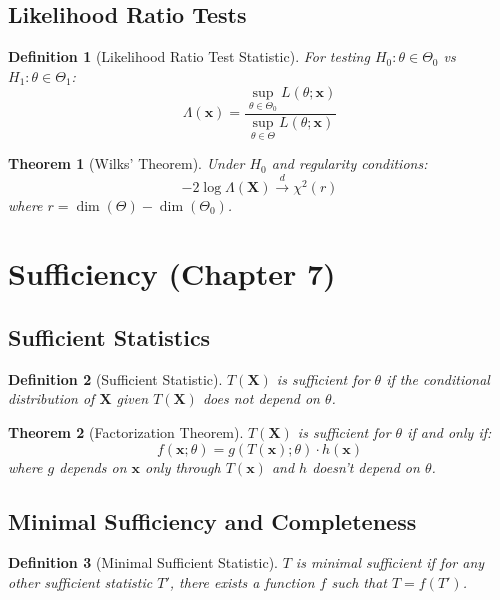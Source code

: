 \documentclass[12pt,a4paper]{amsart}
\newtheorem{theorem}{Theorem}[section]
\newtheorem{definition}{Definition}[section]
\theoremstyle{remark}
\begin{document}
\subsection{Likelihood Ratio Tests}

\begin{definition}[Likelihood Ratio Test Statistic]
For testing $H_0: \theta \in \Theta_0$ vs $H_1: \theta \in \Theta_1$:
$$\Lambda(\mathbf{x}) = \frac{\sup_{\theta \in \Theta_0} L(\theta; \mathbf{x})}{\sup_{\theta \in \Theta} L(\theta; \mathbf{x})}$$
\end{definition}

\begin{theorem}[Wilks' Theorem]
Under $H_0$ and regularity conditions:
$$-2\log\Lambda(\mathbf{X}) \stackrel{d}{\to} \chi^2(r)$$
where $r = \dim(\Theta) - \dim(\Theta_0)$.
\end{theorem}

\section{Sufficiency (Chapter 7)}

\subsection{Sufficient Statistics}

\begin{definition}[Sufficient Statistic]
$T(\mathbf{X})$ is sufficient for $\theta$ if the conditional distribution of $\mathbf{X}$ given $T(\mathbf{X})$ does not depend on $\theta$.
\end{definition}

\begin{theorem}[Factorization Theorem]
$T(\mathbf{X})$ is sufficient for $\theta$ if and only if:
$$f(\mathbf{x}; \theta) = g(T(\mathbf{x}); \theta) \cdot h(\mathbf{x})$$
where $g$ depends on $\mathbf{x}$ only through $T(\mathbf{x})$ and $h$ doesn't depend on $\theta$.
\end{theorem}

\subsection{Minimal Sufficiency and Completeness}

\begin{definition}[Minimal Sufficient Statistic]
$T$ is minimal sufficient if for any other sufficient statistic $T'$, there exists a function $f$ such that $T = f(T')$.
\end{definition}
\end{document}
